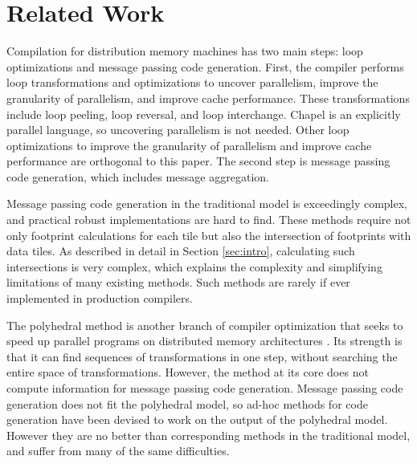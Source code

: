 \section{Related Work}\label{sec:relwork}

Compilation for distribution memory machines has two main steps: loop optimizations and message passing code generation. First, the compiler performs loop transformations and optimizations to uncover parallelism, improve the granularity of parallelism, and improve cache performance. These transformations include loop peeling, loop reversal, and loop interchange. Chapel is an explicitly parallel language, so uncovering parallelism is not needed. Other loop optimizations to improve the granularity of parallelism and improve cache performance are orthogonal to this paper. The second step is message passing code generation, which includes message aggregation.

Message passing code generation in the traditional model is exceedingly complex, and practical robust implementations are hard to find. These methods \cite{xue1997communication,goumas2006message,callahan1988compiling,ramanujam1991compile} require not only footprint calculations for each tile but also the intersection of footprints with data tiles. As described in detail in Section \ref{sec:intro}, calculating such intersections is very complex, which explains the complexity and simplifying limitations of many existing methods. Such methods are rarely if ever implemented in production compilers.

The polyhedral method is another branch of compiler optimization that seeks to speed up parallel programs on distributed memory architectures \cite{Gupta91automaticdata,chavarria2005effective,germain1995automatic, gupta1996compiling, iancu2008performance, wei1998compiling}. Its strength is that it can find sequences of transformations in one step, without searching the entire space of transformations. However, the method at its core does not compute information for message passing code generation. Message passing code generation does not fit the polyhedral model, so ad-hoc methods for code generation have been devised to work on the output of the polyhedral model. However they are no better than corresponding methods in the traditional model, and suffer from many of the same difficulties.

\begin{comment}
This writeup is very confusing. You need to clearly state that the method in [15] only works for aggregate array assignments, and not for general affine loops. [This is alluded to, but you need to reword to make this absolutely clear.

Eg: "goes beyond" is ambigious. Goes beyond in what way?
\end{comment}


